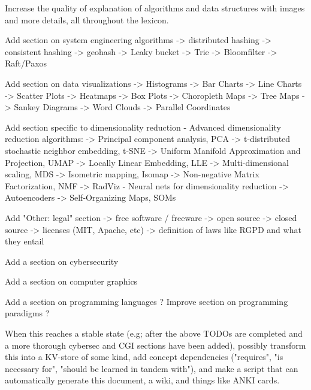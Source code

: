 \documentclass{article}
\begin{document}
Increase the quality of explanation of algorithms and data structures with images and more details, all throughout the lexicon.

Add section on system engineering algorithms
-> distributed hashing
-> consistent hashing
-> geohash
-> Leaky bucket
-> Trie
-> Bloomfilter
-> Raft/Paxos

Add section on data visualizations
-> Histograms
-> Bar Charts
-> Line Charts
-> Scatter Plots
-> Heatmaps
-> Box Plots
-> Choropleth Maps
-> Tree Maps
-> Sankey Diagrams
-> Word Clouds
-> Parallel Coordinates

Add section specific to dimensionality reduction
- Advanced dimensionality reduction algorithms:
-> Principal component analysis, PCA
-> t-distributed stochastic neighbor embedding, t-SNE 
-> Uniform Manifold Approximation and Projection, UMAP
-> Locally Linear Embedding, LLE
-> Multi-dimensional scaling, MDS
-> Isometric mapping, Isomap
-> Non-negative Matrix Factorization, NMF
-> RadViz
- Neural nets for dimensionality reduction
-> Autoencoders
-> Self-Organizing Maps, SOMs

Add "Other: legal" section
-> free software / freeware
-> open source
-> closed source
-> licenses (MIT, Apache, etc)
-> definition of laws like RGPD and what they entail

Add a section on cybersecurity

Add a section on computer graphics

Add a section on programming languages ? Improve section on programming paradigms ?

When this reaches a stable state (e.g; after the above TODOs are completed and a more thorough cybersec and CGI sections have been added), possibly transform this into a KV-store of some kind, add concept dependencies ("requires", "is necessary for", "should be learned in tandem with"), and make a script that can automatically generate this document, a wiki, and things like ANKI cards.
\end{document}
